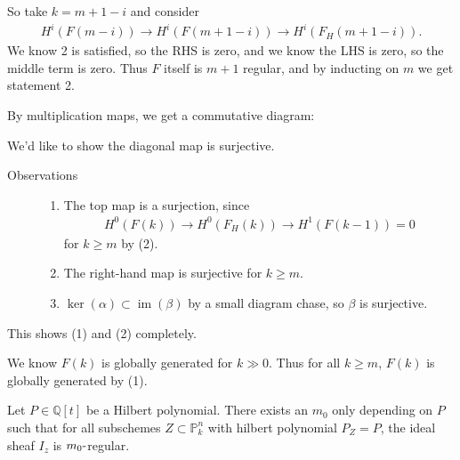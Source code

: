 So take \(k = m+1-i\) and consider
\begin{align*}
H^i(F(m-i)) \to H^i(F(m+1-i)) \to H^i(F_H(m+1-i))
.\end{align*}
We know 2 is satisfied, so the RHS is zero, and we know the LHS is zero,
so the middle term is zero. Thus \(F\) itself is \(m+1\) regular, and by
inducting on \(m\) we get statement 2.

By multiplication maps, we get a commutative diagram:

\begin{center}
\end{center}

We'd like to show the diagonal map is surjective.

\begin{description}
\item[Observations]
\hfill

\begin{enumerate}
\def\labelenumi{\arabic{enumi}.}
\item
  The top map is a surjection, since
  \begin{align*}
  H^0(F(k)) \to H^0(F_H(k)) \to H^1(F(k-1)) = 0
  \end{align*}
  for \(k\geq m\) by (2).
\item
  The right-hand map is surjective for \(k\geq m\).
\item
  \(\ker(\alpha) \subset \operatorname{im}(\beta)\) by a small diagram
  chase, so \(\beta\) is surjective.
\end{enumerate}
\end{description}

This shows (1) and (2) completely.

\begin{description}
\tightlist
\item[Proof (of (3))]
We know \(F(k)\) is globally generated for \(k\gg 0\). Thus for all
\(k\geq m\), \(F(k)\) is globally generated by (1).
\item[Theorem]
Let \(P \in {\mathbb{Q}}[t]\) be a Hilbert polynomial. There exists an
\(m_0\) only depending on \(P\) such that for all subschemes
\(Z \subset {\mathbb{P}}^n_k\) with hilbert polynomial \(P_Z = P\), the
ideal sheaf \(I_z\) is \(m_0{\hbox{-}}\)regular.
\end{description}

